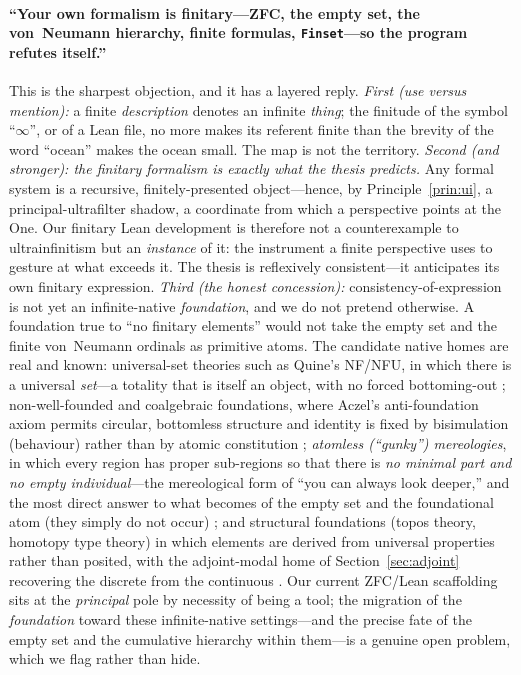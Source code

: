 \documentclass[]{article}
\theoremstyle{definition}
\theoremstyle{remark}
\newcommand{\code}[1]{\texttt{#1}}
\begin{document}
\paragraph{``Your own formalism is finitary---ZFC, the empty set, the von~Neumann
hierarchy, finite formulas, \code{Finset}---so the program refutes itself.''} This
is the sharpest objection, and it has a layered reply. \emph{First (use versus
mention):} a finite \emph{description} denotes an infinite \emph{thing}; the
finitude of the symbol ``$\infty$'', or of a Lean file, no more makes its referent
finite than the brevity of the word ``ocean'' makes the ocean small. The map is not
the territory. \emph{Second (and stronger): the finitary formalism is exactly what
the thesis predicts.} Any formal system is a recursive, finitely-presented
object---hence, by Principle~\ref{prin:ui}, a principal-ultrafilter shadow, a
coordinate from which a perspective points at the One. Our finitary Lean development
is therefore not a counterexample to ultrainfinitism but an \emph{instance} of it:
the instrument a finite perspective uses to gesture at what exceeds it. The thesis is
reflexively consistent---it anticipates its own finitary expression. \emph{Third (the
honest concession):} consistency-of-expression is not yet an infinite-native
\emph{foundation}, and we do not pretend otherwise. A foundation true to ``no
finitary elements'' would not take the empty set and the finite von~Neumann ordinals
as primitive atoms. The candidate native homes are real and known: universal-set
theories such as Quine's NF/NFU, in which there is a universal \emph{set}---a
totality that is itself an object, with no forced bottoming-out
\cite{QuineNF}; non-well-founded and coalgebraic foundations, where Aczel's
anti-foundation axiom permits circular, bottomless structure and identity is fixed
by bisimulation (behaviour) rather than by atomic constitution \cite{AczelAFA};
\emph{atomless (``gunky'') mereologies}, in which every region has proper
sub-regions so that there is \emph{no minimal part and no empty individual}---the
mereological form of ``you can always look deeper,'' and the most direct answer to
what becomes of the empty set and the foundational atom (they simply do not occur)
\cite{LewisParts}; and structural foundations (topos theory, homotopy type theory) in
which elements are derived from universal properties rather than posited, with the
adjoint-modal home of Section~\ref{sec:adjoint} recovering the discrete from the
continuous \cite{MacLaneMoerdijk1992, HoTTBook}. Our current ZFC/Lean scaffolding sits at the
\emph{principal} pole by necessity of being a tool; the migration of the
\emph{foundation} toward these infinite-native settings---and the precise fate of the
empty set and the cumulative hierarchy within them---is a genuine open problem, which
we flag rather than hide.
\end{document}
